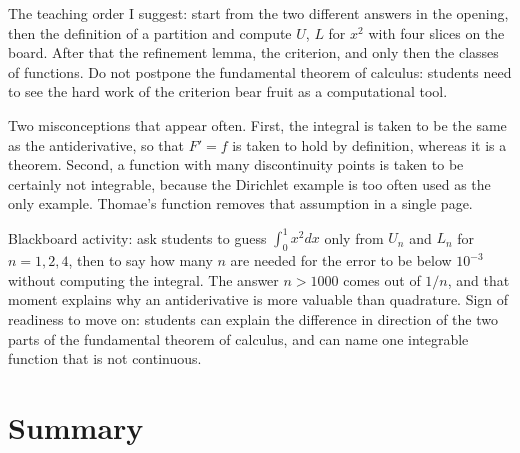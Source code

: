 \begin{untukdosen}
The teaching order I suggest: start from the two different answers in the opening, then
the definition of a partition and compute $U$, $L$ for $x^2$ with four slices on the board. After
that the refinement lemma, the criterion, and only then the classes of functions. Do not postpone the fundamental
theorem of calculus: students need to see the hard work of the criterion bear fruit as a computational tool.

Two misconceptions that appear often. First, the integral is taken to be the same as the antiderivative,
so that $F'=f$ is taken to hold by definition, whereas it is a theorem. Second, a function
with many discontinuity points is taken to be certainly not integrable, because the Dirichlet
example is too often used as the only example. Thomae's function removes
that assumption in a single page.

Blackboard activity: ask students to guess $\int_0^1x^2dx$ only from $U_n$ and
$L_n$ for $n=1,2,4$, then to say how many $n$ are needed for the error to be below
$10^{-3}$ without computing the integral. The answer $n>1000$ comes out of $1/n$, and that moment
explains why an antiderivative is more valuable than quadrature. Sign of readiness
to move on: students can explain the difference in direction of the two parts of the fundamental theorem of calculus,
and can name one integrable function that is not continuous.
\end{untukdosen}

\section{Summary}

